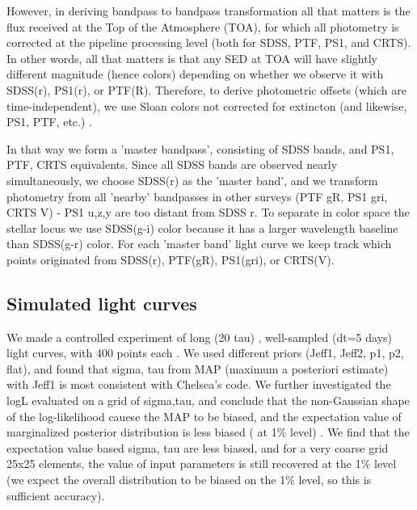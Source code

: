 \documentclass[fleqn,usenatbib]{mnras}  %
\begin{document}
However, in deriving bandpass to bandpass transformation all that matters is the flux received at the Top of the Atmosphere (TOA), for which all photometry is corrected at the pipeline processing level (both for SDSS,  PTF, PS1, and CRTS). In other words, all that matters is that any SED at TOA will have slightly different magnitude (hence colors) depending on whether we observe it with SDSS(r),  PS1(r), or PTF(R).  Therefore, to derive photometric offsets (which are time-independent), we use Sloan colors not corrected for extincton (and likewise, PS1, PTF, etc.) .  

In that way we form a 'master bandpass', consisting of SDSS bands, and PS1, PTF, CRTS equivalents.  Since all SDSS bands are observed nearly simultaneously, we choose SDSS(r) as the 'master band', and we transform photometry from all 'nearby' bandpasses in other surveys (PTF gR,  PS1 gri, CRTS V) - PS1 u,z,y are too distant from SDSS r. To separate in color space the stellar locus we use SDSS(g-i) color because it has a larger wavelength baseline than SDSS(g-r) color.  For each 'master band' light curve we keep track which points originated from SDSS(r),  PTF(gR), PS1(gri), or CRTS(V). 









\subsection{Simulated light curves}
We made a controlled experiment of long (20 tau) , well-sampled (dt=5 days) light curves,  with 400 points each . We used different priors (Jeff1, Jeff2, p1, p2, flat), and found that  sigma, tau from MAP (maximum a posteriori estimate) with Jeff1 is most consistent with Chelsea's code. We further investigated the logL evaluated on  a grid of sigma,tau, and conclude that the non-Gaussian shape of  the log-likelihood cauese the MAP to be biased, and the expectation value of marginalized posterior distribution is less biased  ( at 1\% level) . We find that the expectation value based sigma, tau are less biased, and for a very coarse grid 25x25 elements, the value of input parameters is  still recovered at the 1\% level (we expect the overall distribution to be biased on the 1\% level, so this is sufficient accuracy). 
\end{document}
